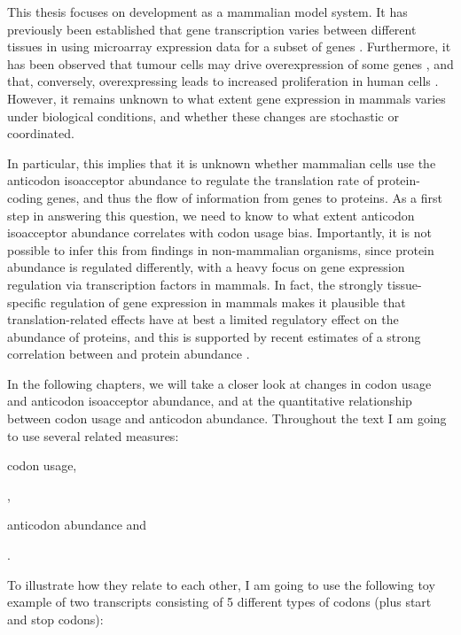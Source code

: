 This thesis focuses on \mmu development as a mammalian model system. It has
previously been established that \trna gene transcription varies between
different tissues in \hsa using microarray expression data for a subset of \trna
genes \citep{Dittmar:2006}. Furthermore, it has been observed that tumour cells
may drive overexpression of some \trna genes
\citep{Winter:2000,Pavon-Eternod:2009}, and that, conversely, overexpressing
 leads to increased proliferation in human cells
\citep{Pavon-Eternod:2013}. However, it remains unknown to what extent \trna
gene expression in mammals varies under biological conditions, and whether these
changes are stochastic or coordinated.

In particular, this implies that it is unknown whether mammalian cells use the
\trna anticodon isoacceptor abundance to regulate the translation rate of
protein-coding genes, and thus the flow of information from genes to proteins.
As a first step in answering this question, we need to know to what extent \trna
anticodon isoacceptor abundance correlates with codon usage bias. Importantly,
it is not possible to infer this from findings in non-mammalian organisms, since
protein abundance is regulated differently, with a heavy focus on gene
expression regulation via transcription factors in mammals. In fact, the
strongly tissue-specific regulation of gene expression in mammals makes it
plausible that translation-related effects have at best a limited regulatory
effect on the abundance of proteins, and this is supported by recent estimates
of a strong correlation between \mrna and protein abundance
\citep{Li:2014,Csardi:2014,Jovanovic:2015}.

In the following chapters, we will take a closer look at changes in codon usage
and \trna anticodon isoacceptor abundance, and at the quantitative relationship
between codon usage and anticodon abundance. Throughout the text I am going to
use several related measures:

\begin{shortenumerate}
    \item codon usage,
    \item \rcu,
    \item anticodon abundance and
    \item \raa.
\end{shortenumerate}

To illustrate how they relate to each other, I am going to use the following toy
example of two transcripts consisting of \num{5} different types of codons (plus
start and stop codons):

